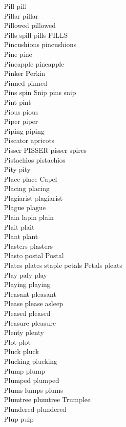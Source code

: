 Pill pill\\
Pillar pillar\\
Pillowed pillowed\\
Pills spill pills PILLS\\
Pincushions pincushions\\
Pine pine\\
Pineapple pineapple\\
Pinker Perkin\\
Pinned pinned\\
Pins spin Snip pins snip\\
Pint pint\\
Pious pious\\
Piper piper\\
Piping piping\\
Piscator apricots\\
Pisser PISSER pisser spires\\
Pistachios pistachios\\
Pity pity\\
Place place Capel\\
Placing placing\\
Plagiarist plagiarist\\
Plague plague\\
Plain lapin plain\\
Plait plait\\
Plant plant\\
Plasters plasters\\
Plasto postal Postal\\
Plates plates staple petals Petals pleats\\
Play paly play\\
Playing playing\\
Pleasant pleasant\\
Please please asleep\\
Pleased pleased\\
Pleasure pleasure\\
Plenty plenty\\
Plot plot\\
Pluck pluck\\
Plucking plucking\\
Plump plump\\
Plumped plumped\\
Plums lumps plums\\
Plumtree plumtree Trumplee\\
Plundered plundered\\
Plup pulp\\
